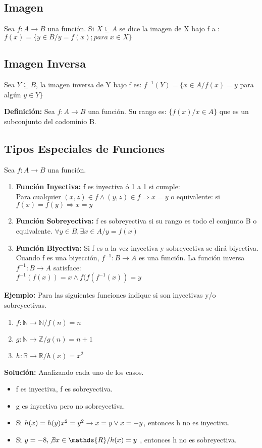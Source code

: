 \subsection{Imagen}
Sea $f:A\rightarrow B$ una función. Si $X\subseteq A$ se dice la imagen de X bajo f a : $f(x)=\lbrace y\in B/ y=f(x) ; para\; x\in X\rbrace$

\subsection{Imagen Inversa}
Sea $Y\subseteq B$, la imagen inversa de Y bajo f es: $f^{-1}(Y)=\lbrace x\in A / f(x)=y$ para algún $y\in Y\rbrace$

\textbf{Definición: } Sea $f:A\rightarrow B$ una función. Su rango es: $\lbrace f(x)/x\in A\rbrace$ que es un subconjunto del codominio B.

\subsection{Tipos Especiales de Funciones}
Sea $f:A\rightarrow B$ una función.
\begin{enumerate}
\item \textbf{Función Inyectiva: }f es inyectiva ó 1 a 1 si cumple:\\
	Para cualquier $(x,z)\in f \land (y,z)\in f\Rightarrow x=y$ o equivalente: si $f(x)=f(y) \Rightarrow x=y$
\item \textbf{Función Sobreyectiva: }f es sobreyectiva si su rango es todo el conjunto B o equivalente. $\forall y\in B, \exists x\in A / y=f(x)$
\item \textbf{Función Biyectiva: }Si f es a la vez inyectiva y sobreyectiva se dirá biyectiva. Cuando f es una biyección, $f^{-1}:B\rightarrow A$ es una función. La función inversa $f^{-1}:B\rightarrow A$ satisface:\\
$f^{-1}(f(x))=x \land f(f(f^{-1}(x))=y$
\end{enumerate}

\textbf{Ejemplo: }Para las siguientes funciones indique si son inyectivas y/o sobreyectivas.
\begin{enumerate}
\item $f:\mathds{N}\rightarrow \mathds{N} / f(n)=n$
\item $g:\mathds{N}\rightarrow \mathds{Z} / g(n)=n+1$
\item $h:\mathds{R}\rightarrow \mathds{R} / h(x)=x^2$
\end{enumerate}

\textbf{Solución: }Analizando cada uno de los casos.
\begin{itemize}
\item f es inyectiva, f es sobreyectiva.
\item g es inyectiva pero no sobreyectiva.
\item Si $h(x)=h(y)\\
			x^2=y^2\\
			\rightarrow x=y \lor x=-y$, entonces h no es inyectiva.
\item Si $y=-8, \not\exists x\in \mathds{R} / h(x)=y$ , entonces h no es sobreyectiva.
\end{itemize}

